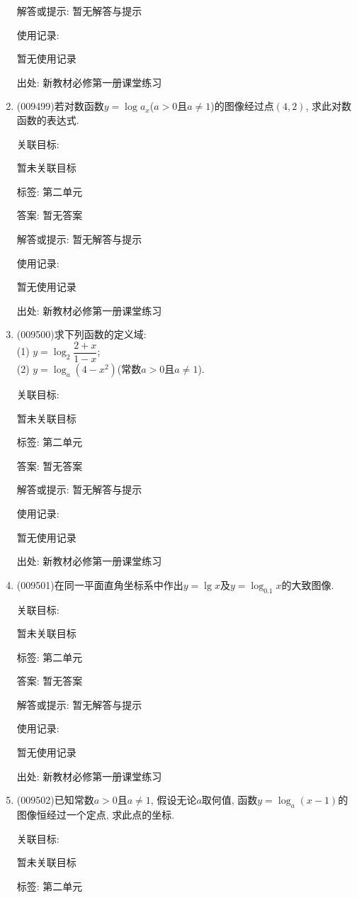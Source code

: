 \documentclass[10pt,a4paper]{article}
\begin{document}
\begin{enumerate}[1.]
解答或提示: 暂无解答与提示

使用记录:

暂无使用记录


出处: 新教材必修第一册课堂练习
\item { (009499)}若对数函数$y=\log a_x$($a>0$且$a\ne 1$)的图像经过点$(4, 2)$, 求此对数函数的表达式.


关联目标:

暂未关联目标



标签: 第二单元

答案: 暂无答案

解答或提示: 暂无解答与提示

使用记录:

暂无使用记录


出处: 新教材必修第一册课堂练习
\item { (009500)}求下列函数的定义域:\\
(1) $y=\log_2\dfrac{2+x}{1-x}$;\\
(2) $y=\log_a(4-x^2)$(常数$a>0$且$a\ne 1$).


关联目标:

暂未关联目标



标签: 第二单元

答案: 暂无答案

解答或提示: 暂无解答与提示

使用记录:

暂无使用记录


出处: 新教材必修第一册课堂练习
\item { (009501)}在同一平面直角坐标系中作出$y=\lg x$及$y=\log_{0.1}x$的大致图像.


关联目标:

暂未关联目标



标签: 第二单元

答案: 暂无答案

解答或提示: 暂无解答与提示

使用记录:

暂无使用记录


出处: 新教材必修第一册课堂练习
\item { (009502)}已知常数$a>0$且$a\ne 1$, 假设无论$a$取何值, 函数$y=\log_a(x-1)$的图像恒经过一个定点, 求此点的坐标.


关联目标:

暂未关联目标



标签: 第二单元


\end{enumerate}
\end{document}
